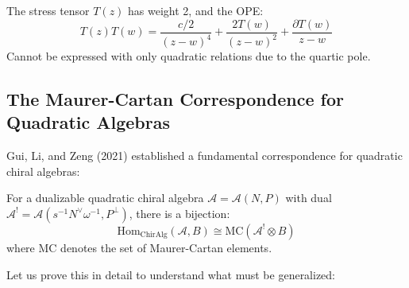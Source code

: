 \begin{example}
The stress tensor $T(z)$ has weight 2, and the OPE:
\[
T(z)T(w) = \frac{c/2}{(z-w)^4} + \frac{2T(w)}{(z-w)^2} + \frac{\partial T(w)}{z-w}
\]
Cannot be expressed with only quadratic relations due to the quartic pole.
\end{example}

\subsection{The Maurer-Cartan Correspondence for Quadratic Algebras}

Gui, Li, and Zeng (2021) established a fundamental correspondence for quadratic chiral algebras:

\begin{theorem}
\label{thm:mc-quadratic}
For a dualizable quadratic chiral algebra $\mathcal{A} = \mathcal{A}(N, P)$ with dual $\mathcal{A}^! = \mathcal{A}(s^{-1}N^{\vee}\omega^{-1}, P^{\perp})$, there is a bijection:
\[
\text{Hom}_{\text{ChirAlg}}(\mathcal{A}, B) \cong \text{MC}(\mathcal{A}^! \otimes B)
\]
where $\text{MC}$ denotes the set of Maurer-Cartan elements.
\end{theorem}

Let us prove this in detail to understand what must be generalized:

